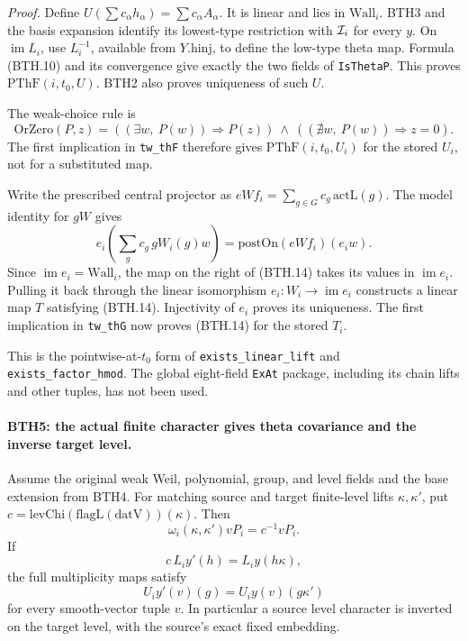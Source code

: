 \emph{Proof.}
Define \(U(\sum c_\alpha h_\alpha)=\sum c_\alpha A_\alpha\).
It is linear and lies in \(\mathrm{Wall}_i\).  BTH3 and the
basis expansion identify its lowest-type restriction with
\({\cal I}_i\) for every \(y\).  On \(\operatorname{im}L_i\),
use \(L_i^{-1}\), available from \(Y.\mathrm{hinj}\), to define
the low-type theta map.  Formula (BTH.10) and its convergence
give exactly the two fields of \texttt{Is\allowbreak Theta\allowbreak P}.
This proves \(\mathrm{PThF}(i,t_0,U)\).
BTH2 also proves uniqueness of such \(U\).

The weak-choice rule is
\[
 \mathrm{OrZero}(P,z)
 =((\exists w,\ P(w))\Rightarrow P(z))
   \ \wedge\ ((\nexists w,\ P(w))\Rightarrow z=0).                \tag{BTH.15}
\]
The first implication in \texttt{tw\_\allowbreak th\allowbreak F} therefore gives
\(\mathrm{PThF}(i,t_0,U_i)\) for the stored \(U_i\), not
for a substituted map.

Write the prescribed central projector as
\(eWf_i=\sum_{g\in G}c_g\,\mathrm{actL}(g)\).
The model identity for \(gW\) gives
\[
 e_i\!\left(\sum_g c_g\,gW_i(g)w\right)
       =\mathrm{postOn}(eWf_i)(e_iw).                           \tag{BTH.16}
\]
Since \(\operatorname{im}e_i=\mathrm{Wall}_i\), the map on
the right of (BTH.14) takes its values in
\(\operatorname{im}e_i\).  Pulling it back through the linear
isomorphism \(e_i:W_i\to\operatorname{im}e_i\) constructs a
linear map \(T\) satisfying (BTH.14).  Injectivity of \(e_i\)
proves its uniqueness.  The first implication in
\texttt{tw\_\allowbreak th\allowbreak G} now proves (BTH.14) for the stored \(T_i\).

This is the pointwise-at-\(t_0\) form of
\texttt{exists\_\allowbreak linear\_\allowbreak lift} and \texttt{exists\_\allowbreak factor\_\allowbreak hmod}.
The global eight-field \texttt{Ex\allowbreak At} package, including its
chain lifts and other tuples, has not been used.

\paragraph{BTH5: the actual finite character gives theta covariance and the inverse target level.}
\label{claim:BTH5}
Assume the original weak Weil, polynomial, group, and level
fields and the base extension from BTH4.  For matching source
and target finite-level lifts \(\kappa,\kappa'\), put
\(c=\mathrm{levChi}(\mathrm{flagL}(\mathrm{datV}))(\kappa)\).
Then
\[
 \omega_i(\kappa,\kappa')vP_i=c^{-1}vP_i.                        \tag{BTH.17}
\]
If
\[
        c\,L_i y'(h)=L_i y(h\kappa),
\]
the full multiplicity maps satisfy
\[
        U_i y'(v)(g)=U_i y(v)(g\kappa')                         \tag{BTH.18}
\]
for every smooth-vector tuple \(v\).  In particular a source
level character is inverted on the target level, with the
source's exact fixed embedding.

